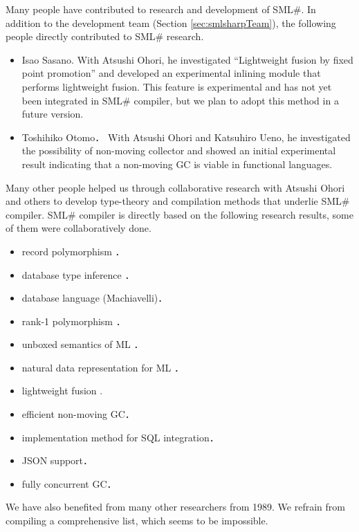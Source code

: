 \documentclass{jbook}
\newcommand{\smlsharp}{SML\#}
\begin{document}
	Many people have contributed to research and development of
\smlsharp{}.
	In addition to the development team (Section
\ref{sec:smlsharpTeam}), the following people directly contributed to 
\smlsharp{} research.
\begin{itemize}
\item Isao Sasano.
With Atsushi Ohori, he investigated 
``Lightweight fusion by fixed point promotion'' and 
developed an experimental inlining module that performs lightweight
fusion.
	This feature is experimental and has not yet been integrated in
\smlsharp{} compiler, but we plan to adopt this method in a future
version.
\item Toshihiko Otomo．
	With Atsushi Ohori and Katsuhiro Ueno, he investigated the
possibility of non-moving collector and showed an initial experimental
result indicating that a non-moving GC is viable in functional
languages.
\end{itemize}
	Many other people helped us through collaborative research with
Atsushi Ohori and others to develop type-theory and compilation methods
that underlie \smlsharp{} compiler.
	\smlsharp{} compiler is directly based on the
following research results, some of them were collaboratively done.
\begin{itemize}
\item record polymorphism \cite{ohor92popl,ohor95toplas}．
\item database type inference \cite{ohor88lfp}．
\item database language (Machiavelli)\cite{ohor89sigmod,bune96tods}．
\item rank-1 polymorphism \cite{ohor99icfp}．
\item unboxed semantics of ML \cite{ohor97unbox}．
\item natural data representation for ML \cite{nguyen06ppdp}．
\item lightweight fusion \cite{ohor07popl}.
\item efficient non-moving GC\cite{ueno11icfp}．
\item implementation method for SQL integration\cite{ohori11icfp}．
\item JSON support\cite{ohori15ecoop}．
\item fully concurrent GC\cite{ueno16icfp}．
\end{itemize}
	We have also benefited from many other researchers from 1989.
	We refrain from compiling a comprehensive list, which seems to
be impossible. 
\fi%
\end{document}
